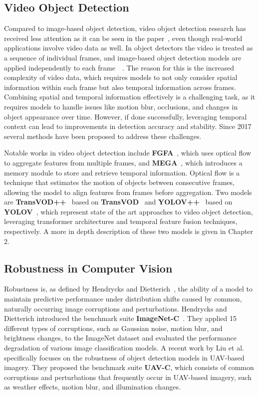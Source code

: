 \documentclass[final,twoside]{vutinfth}
\begin{document}
\subsection{Video Object Detection}
Compared to image-based object detection, video object detection research has received less attention as it can be seen in the paper~\cite{liu2020video}, even though real-world applications involve video data as well.
In object detectors the video is treated as a sequence of individual frames, and image-based object detection models are applied independently to each frame~\cite{zhu2021deformabledetr}~\cite{redmon2016yolo}.
The reason for this is the increased complexity of video data, which requires models to not only consider spatial information within each frame but also temporal information across frames.
Combining spatial and temporal information effectively is a challenging task, as it requires models to handle issues like motion blur, occlusions, and changes in object appearance over time.
However, if done successfully, leveraging temporal context can lead to improvements in detection accuracy and stability.
Since 2017 several methods have been proposed to address these challenges.

Notable works in video object detection include \textbf{FGFA}~\cite{zhu2017flowguidedfeatureaggregationvideo}, which uses optical flow to aggregate features from multiple frames, and \textbf{MEGA}~\cite{chen2020memoryenhancedgloballocalaggregation}, which introduces a memory module to store and retrieve temporal information.
Optical flow is a technique that estimates the motion of objects between consecutive frames, allowing the model to align features from frames before aggregation.
Two models are \textbf{TransVOD++}~\cite{zhou2023transvodpp} based on \textbf{TransVOD}~\cite{zhou2022transvod} and \textbf{YOLOV++}~\cite{shi2024yolovpp} based on \textbf{YOLOV}~\cite{shi2022yolov}, which represent state of the art approaches to video object detection, leveraging transformer architectures and temporal feature fusion techniques, respectively.
A more in depth description of these two models is given in Chapter 2.

\subsection{Robustness in Computer Vision}\label{sec:robcv}
Robustness is, as defined by Hendrycks and Dietterich~\cite{hendrycks2019benchmarking}, the ability of a model to maintain predictive performance under distribution shifts caused by common, naturally occurring image corruptions and perturbations.
Hendrycks and Dietterich introduced the benchmark suite \textbf{ImageNet-C}~\cite{hendrycks2019benchmarking}.
They applied 15 different types of corruptions, such as Gaussian noise, motion blur, and brightness changes, to the ImageNet dataset and evaluated the performance degradation of various image classification models.
A recent work by Liu et al.~\cite{liu2024UAVRobustness} specifically focuses on the robustness of object detection models in UAV-based imagery.
They proposed the benchmark suite \textbf{UAV-C}, which consists of common corruptions and perturbations that frequently occur in UAV-based imagery, such as weather effects, motion blur, and illumination changes.
\end{document}
